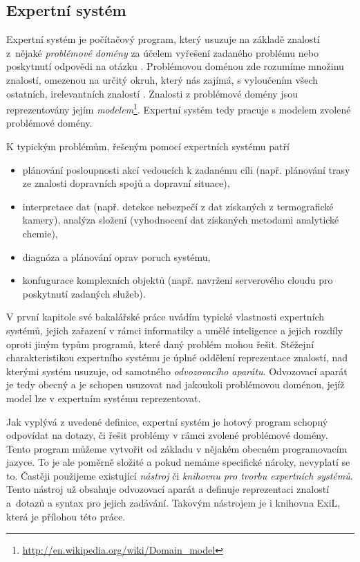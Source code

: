 \subsection{Expertní systém}

Expertní systém je počítačový program, který usuzuje na základě znalostí
z~nějaké \emph{problémové domény} za účelem vyřešení zadaného problému nebo
poskytnutí odpovědi na otázku \cite{introduction}. Problémovou doménou zde
rozumíme množinu znalostí, omezenou na určitý okruh, který nás zajímá, s
vyloučením všech ostatních, irelevantních znalostí \cite{problem-domain}.
Znalosti z problémové domény jsou reprezentovány jejím
\emph{modelem}\footnote{\url{http://en.wikipedia.org/wiki/Domain\_model}}.
Expertní systém tedy pracuje s modelem zvolené problémové domény.

K typickým problémům, řešeným pomocí expertních systému patří
\cite{introduction}
\begin{itemize}
  \item plánování posloupnosti akcí vedoucích k zadanému cíli (např.
    plánování trasy ze znalosti dopravních spojů a dopravní situace),
  \item interpretace dat (např. detekce nebezpečí z dat získaných z
    termografické kamery), analýza složení (vyhodnocení dat získaných metodami
    analytické chemie),
  \item diagnóza a plánování oprav poruch systému,
  \item konfugurace komplexních objektů (např. navržení serverového cloudu pro
    poskytnutí zadaných služeb).
\end{itemize}

V první kapitole své bakalářské práce \cite{bakalarka} uvádím typické vlastnosti
expertních systémů, jejich zařazení v rámci informatiky a umělé inteligence a
jejich rozdíly oproti jiným typům programů, které daný problém mohou řešit.
Stěžejní charakteristikou expertního systému je úplné oddělení reprezentace
znalostí, nad kterými systém usuzuje, od samotného \emph{odvozovacího aparátu}.
Odvozovací aparát je tedy obecný a je schopen usuzovat nad jakoukoli problémovou
doménou, jejíž model lze v expertním systému reprezentovat.

Jak vyplývá z uvedené definice, expertní systém je hotový program schopný
odpovídat na dotazy, či řešit problémy v rámci zvolené problémové domény. Tento
program můžeme vytvořit od základu v nějakém obecném programovacím jazyce. To je
ale poměrně složité a pokud nemáme specifické nároky, nevyplatí se to.  Častěji
použijeme existující \emph{nástroj} či \emph{knihovnu pro tvorbu expertních
systémů}. Tento nástroj už obsahuje odvozovací aparát a definuje reprezentaci
znalostí a~dotazů a syntax pro jejich zadávání. Takovým nástrojem je i knihovna
ExiL, která je přílohou této práce.

